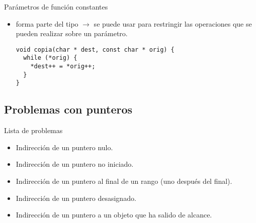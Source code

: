 \begin{frame}[fragile]{Parámetros de función constantes}
\begin{itemize}
  \item {} forma parte del tipo $\rightarrow$ se puede usar para restringir las operaciones que se
        pueden realizar sobre un parámetro.
\begin{lstlisting}
void copia(char * dest, const char * orig) {
  while (*orig) {
    *dest++ = *orig++;
  }
}
\end{lstlisting}
\end{itemize}
\end{frame}

\subsection{Problemas con punteros}

\begin{frame}{Lista de problemas}
\begin{itemize}
  \item Indirección de un puntero nulo.
  \item Indirección de un puntero no iniciado.
  \item Indirección de un puntero al final de un rango (uno después del final).
  \item Indirección de un puntero desasignado.
  \item Indirección de un puntero a un objeto que ha salido de alcance.
\end{itemize}
\end{frame}
